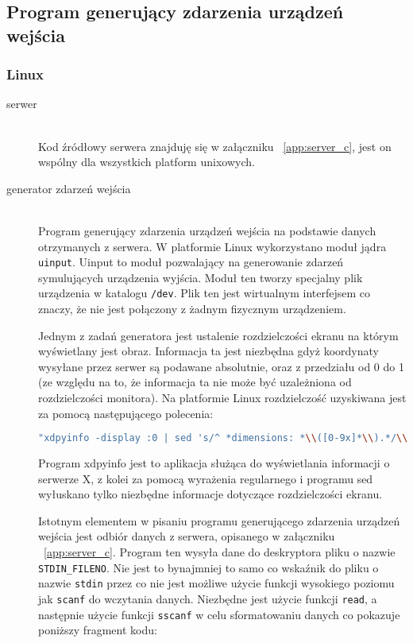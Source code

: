 \subsection{Program generujący zdarzenia urządzeń wejścia}

\subsubsection{Linux}

\begin{description}
	\item[serwer] \hfill \\
Kod źródłowy serwera znajduję się w załączniku ~\ref{app:server_c}, jest on wspólny dla wszystkich platform unixowych.		
	\item[generator zdarzeń wejścia] \hfill \\ 
		Program generujący zdarzenia urządzeń wejścia na podstawie danych otrzymanych z serwera. W platformie Linux wykorzystano moduł jądra \lstinline{uinput}. Uinput to moduł pozwalający na generowanie zdarzeń symulujących urządzenia wyjścia. Moduł ten tworzy specjalny plik urządzenia w katalogu \lstinline{/dev}. Plik ten jest wirtualnym interfejsem co znaczy, że nie jest połączony z żadnym fizycznym urządzeniem.

		Jednym z zadań generatora jest ustalenie rozdzielczości ekranu na którym wyświetlany jest obraz. Informacja ta jest niezbędna gdyż koordynaty wysyłane przez serwer są podawane absolutnie, oraz z przedziału od 0 do 1 (ze względu na to, że informacja ta nie może być uzależniona od rozdzielczości monitora). Na platformie Linux rozdzielczość uzyskiwana jest za pomocą następującego polecenia:
\begin{lstlisting}[language=bash]
"xdpyinfo -display :0 | sed 's/^ *dimensions: *\\([0-9x]*\\).*/\\1/;t;d'";
\end{lstlisting}
		Program xdpyinfo jest to aplikacja służąca do wyświetlania informacji o serwerze X, z kolei za pomocą wyrażenia regularnego i programu sed wyłuskano tylko niezbędne informacje dotyczące rozdzielczości ekranu.

		Istotnym elementem w pisaniu programu generującego zdarzenia urządzeń wejścia jest odbiór danych z serwera, opisanego w załączniku ~\ref{app:server_c}. Program ten wysyła dane do deskryptora pliku o nazwie \lstinline{STDIN_FILENO}. Nie jest to bynajmniej to samo co wskaźnik do pliku o nazwie \lstinline{stdin} przez co nie jest możliwe użycie funkcji wysokiego poziomu jak \lstinline{scanf} do wczytania danych. Niezbędne jest użycie funkcji \lstinline{read}, a następnie użycie funkcji \lstinline{sscanf} w celu sformatowaniu danych co pokazuje poniższy fragment kodu:


\end{description}
